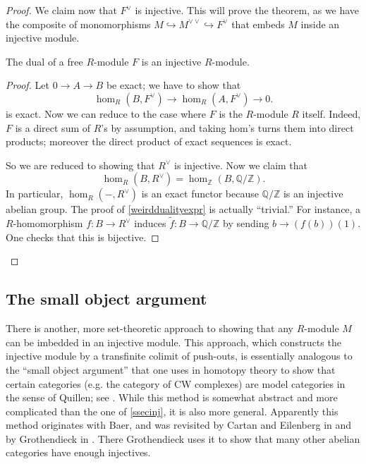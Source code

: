 \begin{proof}
We claim now that $F^{\vee}$ is injective.  This will prove the theorem, as
we have the composite of monomorphisms $M \hookrightarrow M^{\vee \vee} \hookrightarrow F^{\vee}$ that
embeds $M$ inside an injective module.

\begin{lemma} The dual of a  free $R$-module $F$ is an injective
$R$-module.
\end{lemma}
\begin{proof} 
Let $0 \to A \to B $ be exact; we have to show that
\[ \hom_R( B, F^\vee) \to \hom_R(A, F^\vee)  \to 0 .\]
is exact.
Now we can reduce to the case where $F$ is the $R$-module $R$ itself.
Indeed, $F$ is a direct sum of $R$'s by assumption, and taking hom's turns
them into direct products; moreover the direct product of
exact sequences is exact.

So we are reduced to showing that $R^{\vee}$ is injective.
Now we claim that
\begin{equation} \label{weirddualityexpr} \hom_R(B, R^{\vee}) =
\hom_{\mathbb{Z}}(B, \mathbb{Q}/\mathbb{Z}). \end{equation}
In particular, $\hom_R( -, R^\vee)$ is an exact functor because
$\mathbb{Q}/\mathbb{Z}$ is an injective abelian group.
The proof of \cref{weirddualityexpr} is actually ``trivial.''   For instance,
a $R$-homomorphism $f: B \to R^\vee$ induces $\tilde{f}: B \to
\mathbb{Q}/\mathbb{Z}$ by sending $b \to (f(b))(1)$.  One checks that this
is bijective.

\end{proof} 

\end{proof} 

\subsection{The small object argument}

There is another, more set-theoretic approach to showing that any $R$-module
$M$ can be imbedded in an injective module.
This approach, which constructs the injective module by  a transfinite
colimit of push-outs, is essentially analogous to the ``small object
argument'' that one uses in homotopy theory to show that certain categories
(e.g. the category of CW complexes) are model categories in the sense of
Quillen; see \cite{Ho07}.
While this method is somewhat abstract and more complicated than the one of 
\cref{ssecinj}, it is also more general. Apparently this method originates with Baer,
and was revisited by Cartan and Eilenberg in
\cite{Cartan-Eilenberg} and by Grothendieck in \cite{Gr57}.
There Grothendieck uses it to show that
many other abelian categories have enough injectives.


